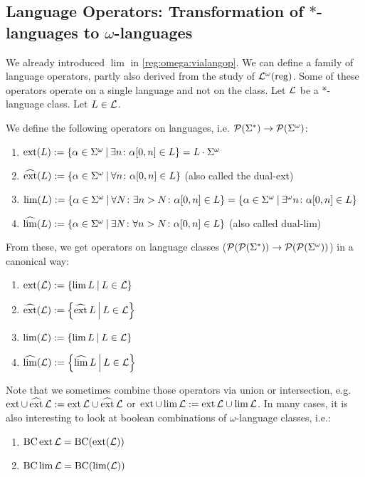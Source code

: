 
\subsection{Language Operators: Transformation of $*$-languages to $\omega$-languages}

We already introduced $\lim$ in \cref{reg:omega:vialangop}. We can define a family of language operators, partly also derived from the study of $\mathcal{L}^\omega(\textup{\textrm{reg}})$. Some of these operators operate on a single language and not on the class. Let $\mathcal{L}$ be a $*$-language class. Let $L \in \mathcal{L}$.

We define the following operators on languages, i.e. $\mathcal{P}(\Sigma^*) \rightarrow \mathcal{P}(\Sigma^\omega)$:
\begin{enumerate}
\item $\ext(L) := \Set{\alpha \in \Sigma^\omega}{ \exists n \colon \alpha[0,n] \in L} = L \cdot \Sigma^\omega$
\item $\dext(L) := \Set{\alpha \in \Sigma^\omega}{ \forall n \colon \alpha[0,n] \in L}$ (also called the dual-ext)
\item $\lim(L) := \Set{ \alpha \in \Sigma^\omega }{ \forall N \colon \exists n > N \colon \alpha[0,n] \in L } = \Set{ \alpha \in \Sigma^\omega }{ \exists^\omega n \colon \alpha[0,n] \in L }$
\item $\dlim(L) := \Set{ \alpha \in \Sigma^\omega }{ \exists N \colon \forall n > N \colon \alpha[0,n] \in L }$ (also called dual-lim)
\end{enumerate}

From these, we get operators on language classes ($\mathcal{P}(\mathcal{P}(\Sigma^*)) \rightarrow \mathcal{P}(\mathcal{P}(\Sigma^\omega))$) in a canonical way:
\begin{enumerate}
\item $\ext(\Lang) := \Set{\lim L}{L \in \Lang}$
\item $\dext(\Lang) := \Set{\dext L}{L \in \Lang}$
\item $\lim(\Lang) := \Set{\lim L}{L \in \Lang}$
\item $\dlim(\Lang) := \Set{\dlim L}{L \in \Lang}$
\end{enumerate}

Note that we sometimes combine those operators via union or intersection, e.g. $\operatorname{ext} \cup \operatorname{\widehat{ext}} \mathcal{L} := \operatorname{ext} \mathcal{L} \cup \operatorname{\widehat{ext}} \mathcal{L}$ or $\operatorname{ext} \cup \lim \mathcal{L} := \operatorname{ext} \mathcal{L} \cup \lim \mathcal{L}$. In many cases, it is also interesting to look at boolean combinations of $\omega$-language classes, i.e.:
\begin{enumerate}
\item $\operatorname{BC} \operatorname{ext} \mathcal{L} = \operatorname{BC} (\operatorname{ext} (\mathcal{L}))$
\item $\operatorname{BC} \lim \mathcal{L} = \operatorname{BC} (\lim (\mathcal{L}))$
\end{enumerate}

